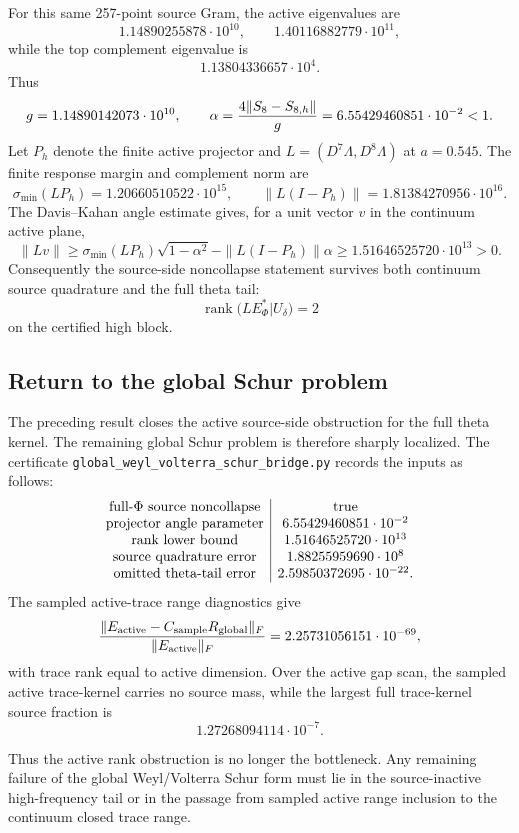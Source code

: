 \documentclass[11pt]{article}
\begin{document}
For this same 257-point source Gram, the active eigenvalues are
\[
  1.14890255878\cdot10^{10},\qquad
  1.40116882779\cdot10^{11},
\]
while the top complement eigenvalue is
\[
  1.13804336657\cdot10^4.
\]
Thus
\[
  g=1.14890142073\cdot10^{10},
  \qquad
  \alpha={4\|S_8-S_{8,h}\|\over g}
  =6.55429460851\cdot10^{-2}<1.
\]
Let \(P_h\) denote the finite active projector and \(L=(D^7\Lambda,D^8\Lambda)\)
at \(a=0.545\).  The finite response margin and complement norm are
\[
  \sigma_{\min}(LP_h)=1.20660510522\cdot10^{15},
  \qquad
  \|L(I-P_h)\|=1.81384270956\cdot10^{16}.
\]
The Davis--Kahan angle estimate gives, for a unit vector \(v\) in the continuum
active plane,
\[
  \|Lv\|\ge
  \sigma_{\min}(LP_h)\sqrt{1-\alpha^2}
  -\|L(I-P_h)\|\alpha
  \ge 1.51646525720\cdot10^{13}>0.
\]
Consequently the source-side noncollapse statement survives both continuum
source quadrature and the full theta tail:
\[
  \operatorname{rank}\big(LE_\Phi^*|U_\delta\big)=2
\]
on the certified high block.

\subsection{Return to the global Schur problem}

The preceding result closes the active source-side obstruction for the full
theta kernel.  The remaining global Schur problem is therefore sharply
localized.  The certificate
\texttt{global\_weyl\_volterra\_schur\_bridge.py} records the inputs as follows:
\[
\begin{array}{c|c}
\hbox{full-\(\Phi\) source noncollapse}&\hbox{true}\\
\hbox{projector angle parameter}&6.55429460851\cdot10^{-2}\\
\hbox{rank lower bound}&1.51646525720\cdot10^{13}\\
\hbox{source quadrature error}&1.88255959690\cdot10^8\\
\hbox{omitted theta-tail error}&2.59850372695\cdot10^{-22}.
\end{array}
\]
The sampled active-trace range diagnostics give
\[
  {\|E_{\rm active}-C_{\rm sample}R_{\rm global}\|_F\over
   \|E_{\rm active}\|_F}
  =2.25731056151\cdot10^{-69},
\]
with trace rank equal to active dimension.  Over the active gap scan, the
sampled active trace-kernel carries no source mass, while the largest full
trace-kernel source fraction is
\[
  1.27268094114\cdot10^{-7}.
\]

Thus the active rank obstruction is no longer the bottleneck.  Any remaining
failure of the global Weyl/Volterra Schur form must lie in the source-inactive
high-frequency tail or in the passage from sampled active range inclusion to
the continuum closed trace range.
\end{document}
